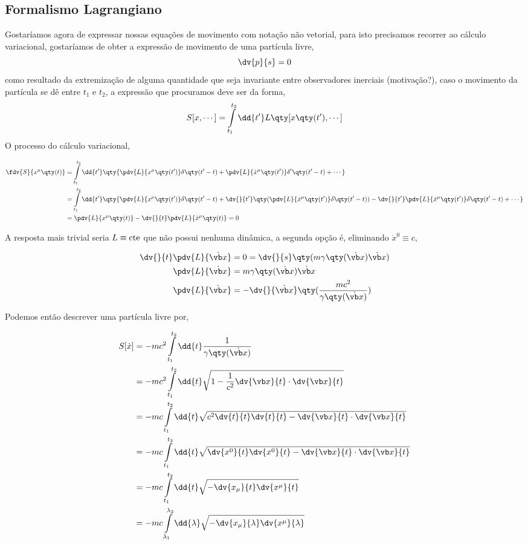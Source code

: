 \documentclass[twoside]{amsart}
\numberwithin{equation}{section}
\begin{document}
\begin{refsection}
\section{Formalismo Lagrangiano}

Gostaríamos agora de expressar nossas equações de movimento com notação não vetorial, para isto precisamos recorrer ao cálculo variacional, gostaríamos de obter a expressão de movimento de uma partícula livre, $$\dv{p}{s}=0$$ como resultado da extremização de alguma quantidade que seja invariante entre observadores inerciais (motivação?), caso o movimento da partícula se dê entre $t_1$ e $t_2$, a expressão que procuramos deve ser da forma, $$S[x,\cdots]=\int\limits_{t_1}^{t_2}\dd{t'}L\qty[x\qty(t'),\cdots]$$ O processo do cálculo variacional,

\begin{align}
    \fdv{S}{x^\mu\qty(t)}&=\int\limits_{t_1}^{t_2}\dd{t'}\qty{\pdv{L}{x^\mu\qty(t')}\delta\qty(t'-t)+\pdv{L}{{\dot x}^\mu\qty(t')}\delta'\qty(t'-t)+\cdots}\\
    &=\int\limits_{t_1}^{t_2}\dd{t'}\qty{\pdv{L}{x^\mu\qty(t')}\delta\qty(t'-t)+\dv{}{t'}\qty(\pdv{L}{{\dot x}^\mu\qty(t')}\delta\qty(t'-t))-\dv{}{t'}\pdv{L}{{\dot x}^\mu\qty(t')}\delta\qty(t'-t)+\cdots}\\
    &=\pdv{L}{x^\mu\qty(t)}-\dv{}{t}\pdv{L}{{\dot x}^\mu\qty(t)}=0
\end{align}

A resposta mais trivial seria $L\equiv \textup{cte}$ que não possui nenhuma dinâmica, a segunda opção é, eliminando ${\dot x}^0\equiv c$,

\begin{align}
    \dv{}{t}\pdv{L}{\dot{\vb x}}&=0=\dv{}{s}\qty(m\gamma\qty(\dot{\vb x})\dot{\vb x})\\
    \pdv{L}{\dot{\vb x}}&=m\gamma\qty(\dot {\vb x})\dot{\vb x}\\
    \pdv{L}{\dot{\vb x}}&=-\dv{}{\dot{\vb x}}\qty(\frac{mc^2}{\gamma\qty(\dot{\vb x})})
\end{align}

Podemos então descrever uma partícula livre por,

\begin{align}
    S[\dot x]&=-mc^2\int\limits_{t_1}^{t_2}\dd{t}\frac{1}{\gamma\qty(\dot{\vb x})}\\
    &=-mc^2\int\limits_{t_1}^{t_2}\dd{t}\sqrt{1-\frac{1}{c^2}\dv{\vb x}{t}\cdot\dv{\vb x}{t}}\\
    &=-mc\int\limits_{t_1}^{t_2}\dd{t}\sqrt{c^2\dv{t}{t}\dv{t}{t}-\dv{\vb x}{t}\cdot\dv{\vb x}{t}}\\
    &=-mc\int\limits_{t_1}^{t_2}\dd{t}\sqrt{\dv{x^0}{t}\dv{x^0}{t}-\dv{\vb x}{t}\cdot\dv{\vb x}{t}}\\
    &=-mc\int\limits_{t_1}^{t_2}\dd{t}\sqrt{-\dv{x_\mu}{t}\dv{x^\mu}{t}}\\
    &=-mc\int\limits_{\lambda_1}^{\lambda_2}\dd{\lambda}\sqrt{-\dv{x_\mu}{\lambda}\dv{x^\mu}{\lambda}}
\end{align}


\end{refsection}
\end{document}
